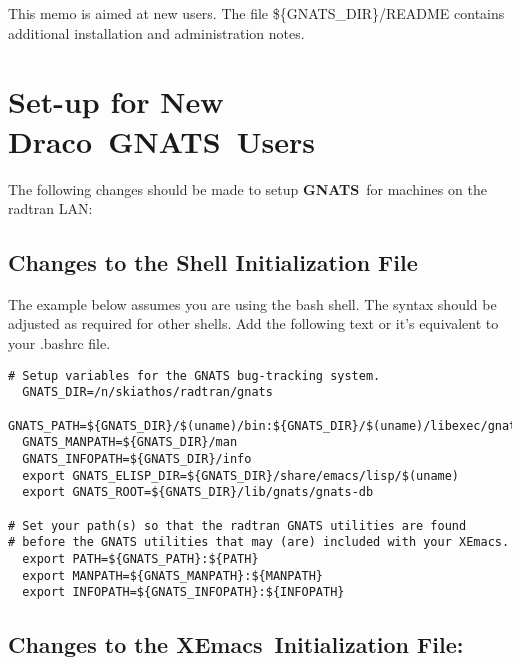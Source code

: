 \documentclass[11pt]{nmemo}
\newcommand{\draco}{{\normalfont\sffamily Draco}}
\newcommand{\xemacs}{{\normalfont\bfseries XEmacs}}
\newcommand{\gnats}{{\normalfont\bfseries GNATS}}
\begin{document}
This memo is aimed at new users.
The file \$\{GNATS\_DIR\}/README
contains additional installation and administration notes.

\section{Set-up for New \draco\ \gnats\ Users}

The following changes should be made to setup \gnats\ for
machines on the radtran LAN:

\subsection {Changes to the Shell Initialization File}

The example below assumes you are using the bash shell.
The syntax should be adjusted as required for other shells.
Add the following text or it's equivalent to your .bashrc file.

\begin{verbatim}
# Setup variables for the GNATS bug-tracking system.
  GNATS_DIR=/n/skiathos/radtran/gnats
  GNATS_PATH=${GNATS_DIR}/$(uname)/bin:${GNATS_DIR}/$(uname)/libexec/gnats
  GNATS_MANPATH=${GNATS_DIR}/man
  GNATS_INFOPATH=${GNATS_DIR}/info
  export GNATS_ELISP_DIR=${GNATS_DIR}/share/emacs/lisp/$(uname)
  export GNATS_ROOT=${GNATS_DIR}/lib/gnats/gnats-db

# Set your path(s) so that the radtran GNATS utilities are found
# before the GNATS utilities that may (are) included with your XEmacs.
  export PATH=${GNATS_PATH}:${PATH}
  export MANPATH=${GNATS_MANPATH}:${MANPATH}
  export INFOPATH=${GNATS_INFOPATH}:${INFOPATH}
\end{verbatim}

\subsection {Changes to the \xemacs\ Initialization File:}
\end{document}
